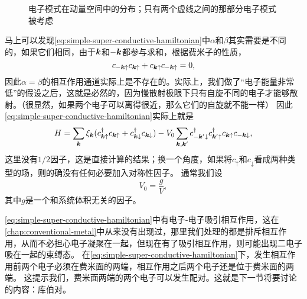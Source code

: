 \begin{figure}
    \centering
    
    \caption{电子模式在动量空间中的分布；只有两个虚线之间的那部分电子模式被考虑}
\end{figure}

马上可以发现\eqref{eq:simple-super-conductive-hamiltonian}中$\alpha$和$\beta$其实需要是不同的，如果它们相同，由于$\vb*{k}$和$- \vb*{k}$都参与求和，根据费米子的性质，
\[
    c_{- \vb*{k} \uparrow} c_{\vb*{k} \uparrow} + c_{\vb*{k} \uparrow} c_{- \vb*{k} \uparrow} = 0,
\]
因此$\alpha = \beta$的相互作用通道实际上是不存在的。实际上，我们做了“电子能量非常低”的假设之后，这就是必然的，因为慢散射极限下只有自旋不同的电子才能够散射。（很显然，如果两个电子可以离得很近，那么它们的自旋就不能一样）
因此\eqref{eq:simple-super-conductive-hamiltonian}实际上就是
\begin{equation}
    H = \sum_{\vb*{k}} \xi_{\vb*{k}} (c^\dagger_{\vb*{k} \uparrow} c_{\vb*{k} \uparrow} + c^\dagger_{\vb*{k} \downarrow} c_{\vb*{k} \downarrow}) - V_0 \sum_{\vb*{k}, \vb*{k}'} c^\dagger_{- \vb*{k}' \downarrow} c^\dagger_{\vb*{k}' \uparrow} c_{\vb*{k} \uparrow} c_{- \vb*{k} \downarrow},
    \label{eq:superconductivity-opposite-mom}
\end{equation}
这里没有$1/2$因子，这是直接计算的结果；换一个角度，如果将$c_\uparrow$和$c_\downarrow$看成两种类型的场，则的确没有任何必要加入对称性因子。
通常我们设
\begin{equation}
    V_0 = \frac{g}{V},
\end{equation}
其中$g$是一个和系统体积无关的因子。

\eqref{eq:simple-super-conductive-hamiltonian}中有电子-电子吸引相互作用，这在\autoref{chap:conventional-metal}中从来没有出现过，那里我们处理的都是排斥相互作用，从而不必担心电子凝聚在一起，但现在有了吸引相互作用，则可能出现二电子吸在一起的束缚态。
在\eqref{eq:simple-super-conductive-hamiltonian}下，发生相互作用前两个电子必须在费米面的两端，相互作用之后两个电子还是位于费米面的两端。
这提示我们，费米面两端的两个电子可以发生配对。这就是下一节将要讨论的内容：库伯对。

